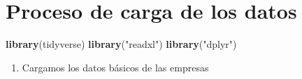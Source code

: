 \documentclass[
  11pt,
  a4paper,
]{book}
\newenvironment{Shaded}{\begin{snugshade}}{\end{snugshade}}
\newcommand{\KeywordTok}[1]{\textcolor[rgb]{0.13,0.29,0.53}{\textbf{#1}}}
\newcommand{\NormalTok}[1]{#1}
\newcommand{\StringTok}[1]{\textcolor[rgb]{0.31,0.60,0.02}{#1}}
\providecommand{\tightlist}{%
  \setlength{\itemsep}{0pt}\setlength{\parskip}{0pt}}
\begin{document}
\hypertarget{proceso-de-carga-de-los-datos}{%
\section{Proceso de carga de los
datos}\label{proceso-de-carga-de-los-datos}}

\begin{Shaded}
\begin{Highlighting}[]
\KeywordTok{library}\NormalTok{(tidyverse)}
\KeywordTok{library}\NormalTok{(}\StringTok{"readxl"}\NormalTok{)}
\KeywordTok{library}\NormalTok{(}\StringTok{"dplyr"}\NormalTok{)}
\end{Highlighting}
\end{Shaded}

\begin{enumerate}
\def\labelenumi{\arabic{enumi}.}
\tightlist
\item
  Cargamos los datos básicos de las empresas
\end{enumerate}
\end{document}
